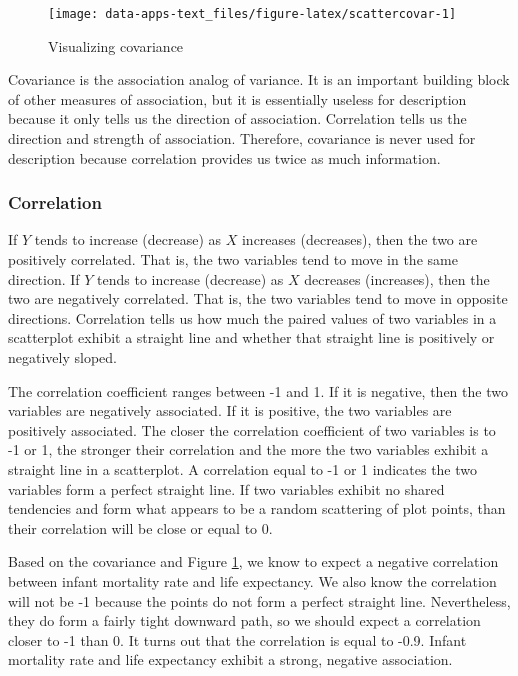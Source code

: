 \documentclass[
]{book}
\begin{document}
\begin{figure}

{\centering \texttt{[image: data-apps-text\_files/figure-latex/scattercovar-1]} 

}

\caption{Visualizing covariance}\label{fig:scattercovar}
\end{figure}

Covariance is the association analog of variance. It is an important building block of other measures of association, but it is essentially useless for description because it only tells us the direction of association. Correlation tells us the direction and strength of association. Therefore, covariance is never used for description because correlation provides us twice as much information.

\hypertarget{correlation}{%
\subsubsection*{Correlation}\label{correlation}}

If \(Y\) tends to increase (decrease) as \(X\) increases (decreases), then the two are positively correlated. That is, the two variables tend to move in the same direction. If \(Y\) tends to increase (decrease) as \(X\) decreases (increases), then the two are negatively correlated. That is, the two variables tend to move in opposite directions. Correlation tells us how much the paired values of two variables in a scatterplot exhibit a straight line and whether that straight line is positively or negatively sloped.

The correlation coefficient ranges between -1 and 1. If it is negative, then the two variables are negatively associated. If it is positive, the two variables are positively associated. The closer the correlation coefficient of two variables is to -1 or 1, the stronger their correlation and the more the two variables exhibit a straight line in a scatterplot. A correlation equal to -1 or 1 indicates the two variables form a perfect straight line. If two variables exhibit no shared tendencies and form what appears to be a random scattering of plot points, than their correlation will be close or equal to 0.

Based on the covariance and Figure \ref{fig:scattercovar}, we know to expect a negative correlation between infant mortality rate and life expectancy. We also know the correlation will not be -1 because the points do not form a perfect straight line. Nevertheless, they do form a fairly tight downward path, so we should expect a correlation closer to -1 than 0. It turns out that the correlation is equal to -0.9. Infant mortality rate and life expectancy exhibit a strong, negative association.
\end{document}
